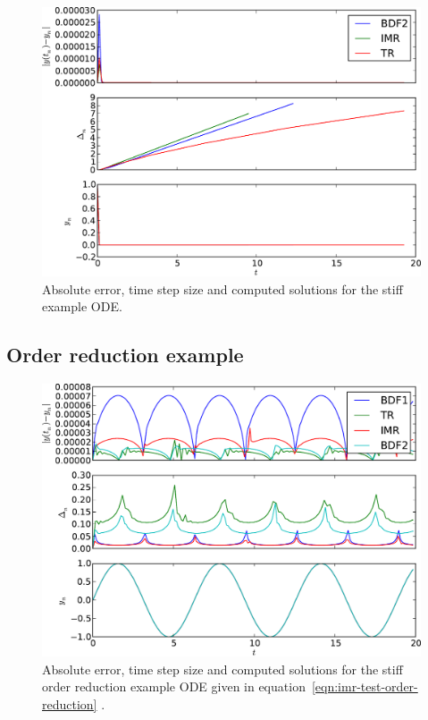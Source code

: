 \begin{figure}[\figpos]
  \centering
  \includegraphics[width=1\textwidth]{plots/aimr_odes/simple_stiff-errornormsvs-dtsvs-tracevaluesvstimes}
  \caption{Absolute error, time step size and computed solutions for the stiff example ODE.}
  \label{fig:imr-stiff-example}
\end{figure}


\subsection{Order reduction example}
\label{sec:order-reduct-example}

\begin{figure}
  \centering  \includegraphics[width=1\textwidth]{plots/aimr_odes/strong_order_reduction-errornormsvs-dtsvs-tracevaluesvstimes}
  \caption{Absolute error, time step size and computed solutions for the stiff order reduction example ODE given in equation~\eqref{eqn:imr-test-order-reduction}
    .}
  \label{fig:imr-order-reduction-example}
\end{figure}

